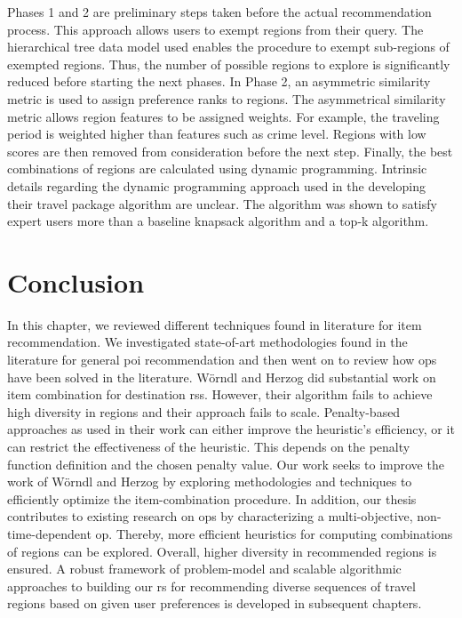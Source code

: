 Phases 1 and 2 are preliminary steps taken before the actual recommendation process. This approach allows users to exempt regions from their query. The hierarchical tree data model used enables the procedure to exempt sub-regions of exempted regions. Thus, the number of possible regions to explore is significantly reduced before starting the next phases. In Phase 2, an asymmetric similarity metric is used to assign preference ranks to regions. The asymmetrical similarity metric allows region features to be assigned weights. For example, the traveling period is weighted higher than features such as crime level. Regions with low scores are then removed from consideration before the next step. Finally, the best combinations of regions are calculated using dynamic programming. Intrinsic details regarding the dynamic programming approach used in the developing their travel package algorithm are unclear. The algorithm was shown to satisfy expert users more than a baseline knapsack algorithm and a top-k algorithm.


\section{Conclusion}
In this chapter, we reviewed different techniques found in literature for item recommendation. We investigated state-of-art methodologies found in the literature for general \gls{poi} recommendation and then went on to review how \glspl{op} have been solved in the literature. Wörndl and Herzog \parencite{cbrecsys2014} did substantial work on item combination for destination \glspl{rs}. However, their algorithm fails to achieve high diversity in regions \parencite{cbrecsys2014} and their approach fails to scale. Penalty-based approaches as used in their work can either improve the heuristic’s efficiency, or it can restrict the effectiveness of the heuristic. This depends on the penalty function definition and the chosen penalty value. Our work seeks to improve the work of Wörndl and Herzog by exploring methodologies and techniques to efficiently optimize the item-combination procedure. In addition, our thesis contributes to existing research on \glspl{op} by characterizing a multi-objective, non-time-dependent \gls{op}. Thereby, more efficient heuristics for computing combinations of regions can be explored. Overall, higher diversity in recommended regions is ensured. A robust framework of problem-model and scalable algorithmic approaches to building our \gls{rs} for recommending diverse sequences of travel regions based on given user preferences is developed in subsequent chapters.
